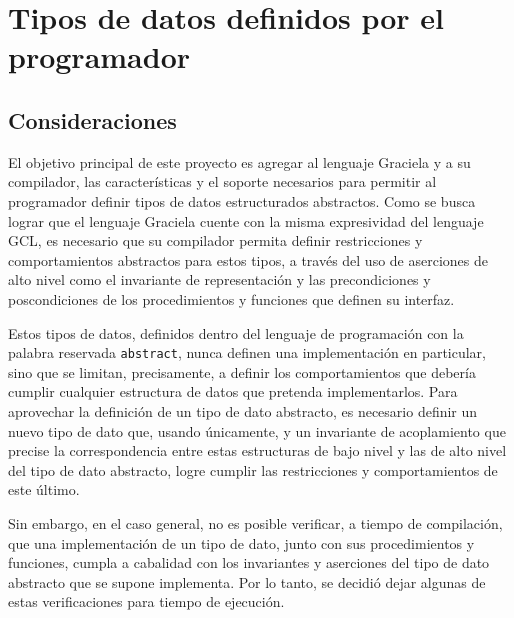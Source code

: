 \section{Tipos de datos definidos por el programador}



\subsection{Consideraciones}

El objetivo principal de este proyecto es agregar al lenguaje Graciela y a su
compilador, las características y el soporte necesarios para permitir al
programador definir tipos de datos estructurados abstractos. Como se busca
lograr que el lenguaje Graciela cuente con la misma expresividad del lenguaje
GCL, es necesario que su compilador permita definir restricciones y
comportamientos abstractos para estos tipos, a través del uso de aserciones de
alto nivel como el invariante de representación y las precondiciones y
poscondiciones de los procedimientos y funciones que definen su interfaz.

Estos tipos de datos, definidos dentro del lenguaje de programación con la
palabra reservada \texttt{abstract}, nunca definen una implementación en
particular, sino que se limitan, precisamente, a definir los comportamientos que
debería cumplir cualquier estructura de datos que pretenda implementarlos. Para
aprovechar la definición de un tipo de dato abstracto, es necesario definir un
nuevo tipo de dato que, usando únicamente, 
y un invariante de acoplamiento que precise la correspondencia entre estas
estructuras de bajo nivel y las de alto nivel del tipo de dato abstracto, logre
cumplir las restricciones y comportamientos de este último.

Sin embargo, en el caso general, no es posible verificar, a tiempo de
compilación, que una implementación de un tipo de dato, junto con sus
procedimientos y funciones, cumpla a cabalidad con los invariantes y aserciones
del tipo de dato abstracto que se supone implementa. Por lo tanto, se decidió
dejar algunas de estas verificaciones para tiempo de ejecución.

